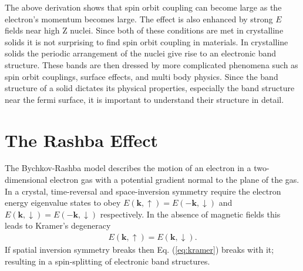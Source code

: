 \documentclass[12pt]{article}
\begin{document}
The above derivation shows that spin orbit coupling can become large as the electron's momentum becomes large.
The effect is also enhanced by strong $E$ fields near high Z nuclei.
Since both of these conditions are met in crystalline solids it is not surprising to find spin orbit coupling in materials.
In crystalline solids the periodic arrangement of the nuclei give rise to an electronic band structure.
These bands are then dressed by more complicated phenomena such as spin orbit couplings, surface effects, and multi body physics.
Since the band structure of a solid dictates its physical properties, especially the band structure near the fermi surface, it is important to understand their structure in detail.

\section{The Rashba Effect}
The Bychkov-Rashba model describes the motion of an electron in a two-dimensional electron gas with a potential gradient normal to the plane of the gas\cite{Rashba}.
In a crystal, time-reversal and space-inversion symmetry require the electron energy eigenvalue states to obey $E(\boldsymbol{k},\uparrow)=E(-\boldsymbol{k},\downarrow)$ and $E(\boldsymbol{k},\downarrow)=E(-\boldsymbol{k},\downarrow)$ respectively\cite{Okuda-Kimura}.
In the absence of magnetic fields this leads to Kramer's degeneracy
\begin{align}
  \label{eq:kramer}
  E(\boldsymbol{k},\uparrow)=E(\boldsymbol{k},\downarrow)\text{.}
\end{align}
If spatial inversion symmetry breaks then Eq. (\ref{eq:kramer}) breaks with it; resulting in a spin-splitting of electronic band structures\cite{Winkler}.
\end{document}
